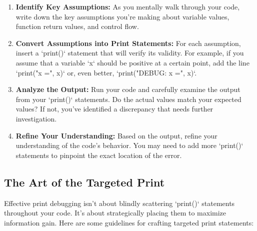 \documentclass{article}
\begin{document}
\begin{enumerate}
    \item \textbf{Identify Key Assumptions:} As you mentally walk through your code, write down the key assumptions you're making about variable values, function return values, and control flow.

    \item \textbf{Convert Assumptions into Print Statements:} For each assumption, insert a `print()` statement that will verify its validity. For example, if you assume that a variable `x` should be positive at a certain point, add the line `print("x =", x)` or, even better, `print("DEBUG: x =", x)`.

    \item \textbf{Analyze the Output:} Run your code and carefully examine the output from your `print()` statements. Do the actual values match your expected values? If not, you've identified a discrepancy that needs further investigation.

    \item \textbf{Refine Your Understanding:} Based on the output, refine your understanding of the code's behavior. You may need to add more `print()` statements to pinpoint the exact location of the error.
\end{enumerate}

\subsection*{The Art of the Targeted Print}

Effective print debugging isn't about blindly scattering `print()` statements throughout your code. It's about strategically placing them to maximize information gain. Here are some guidelines for crafting targeted print statements:
\end{document}
